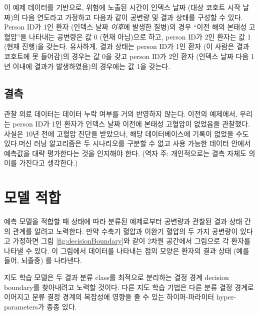 \documentclass[10.5pt]{book}
\theoremstyle{definition}
\theoremstyle{definition}
\theoremstyle{definition}
\theoremstyle{remark}
\begin{document}
이 예제 데이터를 기반으로, 위험에 노출된 시간이 인덱스 날짜 (대상 코호트
시작 날짜)의 다음 연도라고 가정하고 다음과 같이 공변량 및 결과 상태를
구성할 수 있다. Person ID가 1인 환자 (인덱스 날짜 \emph{이후}에 발생한
질병)의 경우 ``이전 해의 본태성 고혈압''을 나타내는 공변량은 값 0 (현재
아님)으로 하고, person ID가 2인 환자는 값 1 (현재 진행)을 갖는다.
유사하게, 결과 상태는 person ID가 1인 환자 (이 사람은 결과 코호트에 못
들어감)의 경우는 값 0을 갖고 person ID가 2인 환자 (인덱스 날짜 다음 1년
이내에 결과가 발생하였음)의 경우에는 값 1을 갖는다.

\subsection{결측}

관찰 의료 데이터는 데이터 누락 여부를 거의 반영하지 않는다. 이전의
예제에서, 우리는 person ID가 1인 환자가 인덱스 날짜 이전에 본태성
고혈압이 없었음을 관찰했다. 사실은 10년 전에 고혈압 진단을 받았으나,
해당 데이터베이스에 기록이 없었을 수도 있다.머신 러닝 알고리즘은 두
시나리오를 구분할 수 없고 사용 가능한 데이터 안에서 예측값을 대략
평가한다는 것을 인지해야 한다. (역자 주: 개인적으로는 결측 자체도 의미를
가진다고 생각한다.) 

\section{모델 적합}\label{modelFitting}

예측 모델을 적합할 때 상태에 따라 분류된 예제로부터 공변량과 관찰된 결과
상태 간의 관계를 알려고 노력한다. 만약 수축기 혈압과 이완기 혈압의 두
가지 공변량이 있다고 가정하면 그림 \ref{fig:decisionBoundary}와 같이
2차원 공간에서 그림으로 각 환자를 나타낼 수 있다. 이 그림에서 데이터를
나타내는 점의 모양은 환자의 결과 상태 (예를 들어, 뇌졸중) 를 나타낸다.

지도 학습 모델은 두 결과 분류 class를 최적으로 분리하는 결정 경계
decision boundary를 찾아내려고 노력할 것이다. 다른 지도 학습 기법은 다른
분류 결정 경계로 이어지고 분류 결정 경계의 복잡성에 영향을 줄 수 있는
하이퍼-파라미터 hyper-parameters가 종종 있다. 
\end{document}
